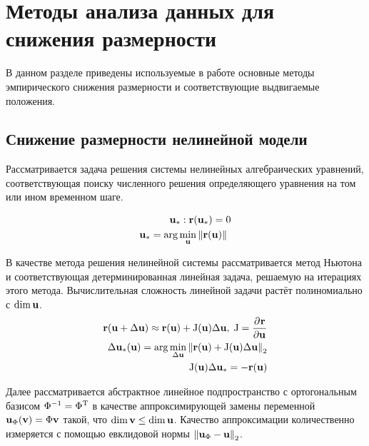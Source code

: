 \section{Методы анализа данных для снижения размерности}

В данном разделе приведены используемые в работе основные методы эмпирического снижения размерности и соответствующие выдвигаемые положения.

\subsection{Снижение размерности нелинейной модели}

Рассматривается задача решения системы нелинейных алгебраических уравнений, соответствующая поиску численного решения определяющего уравнения на том или ином временном шаге.

\begin{align}
    \unk_\ast : \resid(\unk_\ast) = 0 \\
   \unk_\ast = \arg \min_{\unk} \norm{\resid(\unk)}
\end{align}

В качестве метода решения нелинейной системы рассматривается метод Ньютона и соответствующая детерминированная линейная задача, решаемую на итерациях этого метода. Вычислительная сложность линейной задачи растёт полиномиально с $\dim \unk$.
\begin{align}
    \resid(\unk + \Delta \unk) \approx \resid(\unk) + \jac(\unk) \dunk ,\; \jac = \deriv{\resid}{\unk}\\
    \dunk_\ast (\unk) = \arg \min_{\dunk} \norm[2]{\resid(\unk) + \jac(\unk) \dunk} \label{eq:du}\\
    \jac(\unk) \dunk_\ast = - \resid(\unk)
\end{align}

Далее рассматривается абстрактное линейное подпространство с ортогональным базисом $\Phi^{-1} = \transpose{\Phi}$ в качестве аппроксимирующей замены переменной $\unk_\Phi (\vunk) = \Phi \vunk$ такой, что $\dim{\vunk} \leq \dim{\unk}$. Качество аппроксимации количественно измеряется с помощью евклидовой нормы $\norm[2]{\unk_\Phi - \unk}$.


